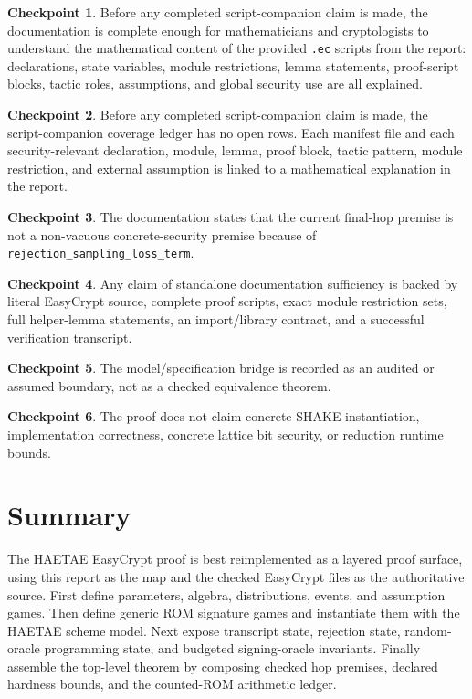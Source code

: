 \documentclass[11pt]{report}
\DeclareRobustCommand{\file}[1]{\ifmmode\text{\nolinkurl{#1}}\else\nolinkurl{#1}\fi}
\DeclareRobustCommand{\ec}[1]{\ifmmode\text{\nolinkurl{#1}}\else\nolinkurl{#1}\fi}
\theoremstyle{definition}
\newtheorem{checkpoint}{Checkpoint}[chapter]
\theoremstyle{plain}
\begin{document}
\begin{checkpoint}
Before any completed script-companion claim is made, the documentation is
complete enough for mathematicians and cryptologists to understand the
mathematical content of the provided \file{.ec} scripts from the report:
declarations, state variables, module restrictions, lemma statements,
proof-script blocks, tactic roles, assumptions, and global security use are all
explained.
\end{checkpoint}

\begin{checkpoint}
Before any completed script-companion claim is made, the script-companion
coverage ledger has no open rows.  Each manifest file and each
security-relevant declaration, module, lemma, proof block, tactic pattern,
module restriction, and external assumption is linked to a mathematical
explanation in the report.
\end{checkpoint}

\begin{checkpoint}
The documentation states that the current final-hop premise is not a
non-vacuous concrete-security premise because of
\ec{rejection\_sampling\_loss\_term}.
\end{checkpoint}

\begin{checkpoint}
Any claim of standalone documentation sufficiency is backed by literal
EasyCrypt source, complete proof scripts, exact module restriction sets, full
helper-lemma statements, an import/library contract, and a successful
verification transcript.
\end{checkpoint}

\begin{checkpoint}
The model/specification bridge is recorded as an audited or assumed boundary,
not as a checked equivalence theorem.
\end{checkpoint}

\begin{checkpoint}
The proof does not claim concrete SHAKE instantiation, implementation
correctness, concrete lattice bit security, or reduction runtime bounds.
\end{checkpoint}

\chapter{Summary}

The HAETAE EasyCrypt proof is best reimplemented as a layered proof surface,
using this report as the map and the checked EasyCrypt files as the authoritative
source.  First define parameters, algebra, distributions, events, and assumption
games.  Then define generic ROM signature games and instantiate them with the
HAETAE scheme model.  Next expose transcript state, rejection state,
random-oracle programming state, and budgeted signing-oracle invariants.
Finally assemble the top-level theorem by composing checked hop premises,
declared hardness bounds, and the counted-ROM arithmetic ledger.
\end{document}
